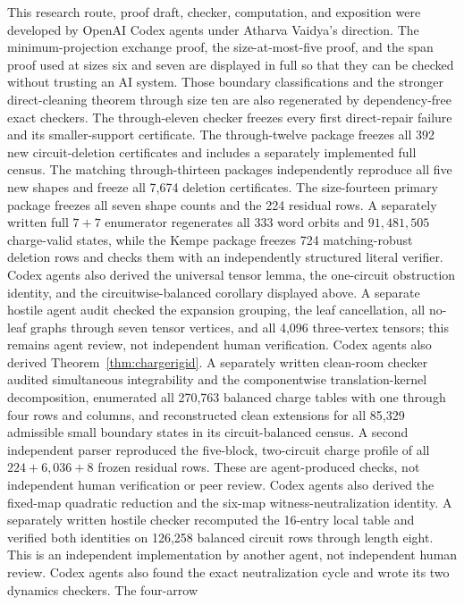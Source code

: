 \documentclass[11pt]{article}
\theoremstyle{definition}
\theoremstyle{remark}
\begin{document}
This research route, proof draft, checker, computation, and exposition were
developed by OpenAI Codex agents under Atharva Vaidya's direction.  The
minimum-projection exchange proof, the size-at-most-five proof, and the
span proof used at sizes six and seven are displayed in full so that they
can be checked without trusting an AI system.  Those boundary
classifications and the stronger direct-cleaning theorem through size ten
are also regenerated by dependency-free exact checkers.  The
through-eleven checker freezes every first direct-repair failure and its
smaller-support certificate.  The through-twelve package freezes all 392
new circuit-deletion certificates and includes a separately implemented
full census.  The matching through-thirteen packages independently
reproduce all five new shapes and freeze all 7,674 deletion certificates.
The size-fourteen primary package freezes all seven shape counts and the
224 residual rows.  A separately written full \(7+7\) enumerator
regenerates all 333 word orbits and \(91{,}481{,}505\) charge-valid
states, while the Kempe package freezes 724 matching-robust deletion rows
and checks them with an independently structured literal verifier.
Codex agents also derived the universal tensor lemma, the one-circuit
obstruction identity, and the circuitwise-balanced corollary displayed
above.  A separate hostile agent audit checked the expansion grouping,
the leaf cancellation, all no-leaf graphs through seven tensor vertices,
and all 4,096 three-vertex tensors; this remains agent review, not
independent human verification.  Codex agents also derived
Theorem~\ref{thm:chargerigid}.  A separately written clean-room checker
audited simultaneous integrability and the componentwise
translation-kernel decomposition, enumerated all 270,763 balanced charge
tables with one through four rows and columns, and reconstructed clean
extensions for all 85,329 admissible small boundary states in its
circuit-balanced census.  A second independent parser reproduced the
five-block, two-circuit charge profile of all $224+6{,}036+8$ frozen
residual rows.  These are agent-produced checks, not independent human
verification or peer review.  Codex agents also derived the fixed-map
quadratic reduction and the six-map witness-neutralization identity.
A separately written hostile checker recomputed the 16-entry local table
and verified both identities on 126,258 balanced circuit rows through
length eight.  This is an independent implementation by another agent,
not independent human review.  Codex agents also found the exact
neutralization cycle and wrote its two dynamics checkers.  The four-arrow
\end{document}
